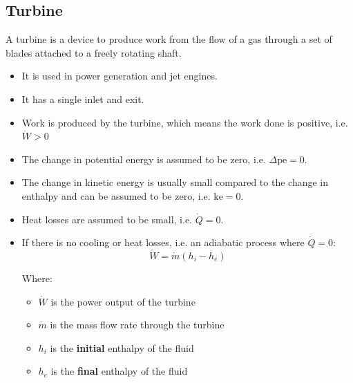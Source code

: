 \documentclass[11pt]{article}
\begin{document}
\subsection{Turbine}
\label{sec:orge9bdbc8}
A turbine is a device to produce work from the flow of a gas through a set of blades attached to a freely rotating shaft.
\begin{itemize}
\item It is used in power generation and jet engines.
\item It has a single inlet and exit.
\item Work is produced by the turbine, which means the work done is positive, i.e. \(\dot{W} > 0\)
\item The change in potential energy is assumed to be zero, i.e. \(\Delta \text{pe} = 0\).
\item The change in kinetic energy is usually small compared to the change in enthalpy and can be assumed to be zero, i.e. \(\text{ke} = 0\).
\item Heat losses are assumed to be small, i.e. \(\dot{Q} = 0\).
\item If there is no cooling or heat losses, i.e. an adiabatic process where \(\dot{Q} = 0\):
\[\dot{W} = \dot{m} \left(h_i - h_e \right)\]

Where:
\begin{itemize}
\item \(\dot{W}\) is the power output of the turbine
\item \(\dot{m}\) is the mass flow rate through the turbine
\item \(h_i\) is the \textbf{initial} enthalpy of the fluid
\item \(h_e\) is the \textbf{final} enthalpy of the fluid
\end{itemize}
\end{itemize}

\newpage
\end{document}
